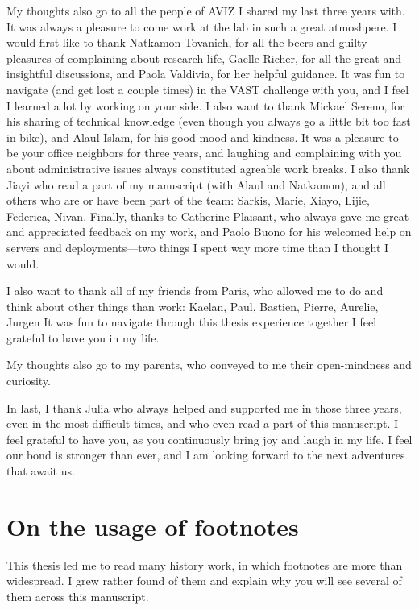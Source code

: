 My thoughts also go to all the people of AVIZ I shared my last three years with. It was always a pleasure to come work at the lab in such a great atmoshpere.
I would first like to thank Natkamon Tovanich, for all the beers and guilty pleasures of complaining about research life, Gaelle Richer, for all the great and insightful discussions, and Paola Valdivia, for her helpful guidance.
It was fun to navigate (and get lost a couple times) in the VAST challenge with you, and I feel I learned a lot by working on your side.
I also want to thank Mickael Sereno, for his sharing of technical knowledge (even though you always go a little bit too fast in bike), and Alaul Islam, for his good mood and kindness. It was a pleasure to be your office neighbors for three years, and laughing and complaining with you about administrative issues always constituted agreable work breaks.
I also thank Jiayi who read a part of my manuscript (with Alaul and Natkamon), and all others who are or have been part of the team: Sarkis, Marie, Xiayo, Lijie, Federica, Nivan.
Finally, thanks to Catherine Plaisant, who always gave me great and appreciated feedback on my work, and Paolo Buono for his welcomed help on servers and deployments---two things I spent way more time than I thought I would.


I also want to thank all of my friends from Paris, who allowed me to do and think about other things than work: Kaelan, Paul, Bastien, Pierre, Aurelie, Jurgen
It was fun to navigate through this thesis experience together
I feel grateful to have you in my life.


My thoughts also go to my parents, who conveyed to me their open-mindness and curiosity.


In last, I thank Julia who always helped and supported me in those three years, even in the most difficult times, and who even read a part of this manuscript.
I feel grateful to have you, as you continuously bring joy and laugh in my life.
I feel our bond is stronger than ever, and I am looking forward to the next adventures that await us.










\newpage

\section*{On the usage of footnotes}

This thesis led me to read many history work, in which footnotes are more than widespread. I grew rather found of them and explain why you will see several of them across this manuscript.


